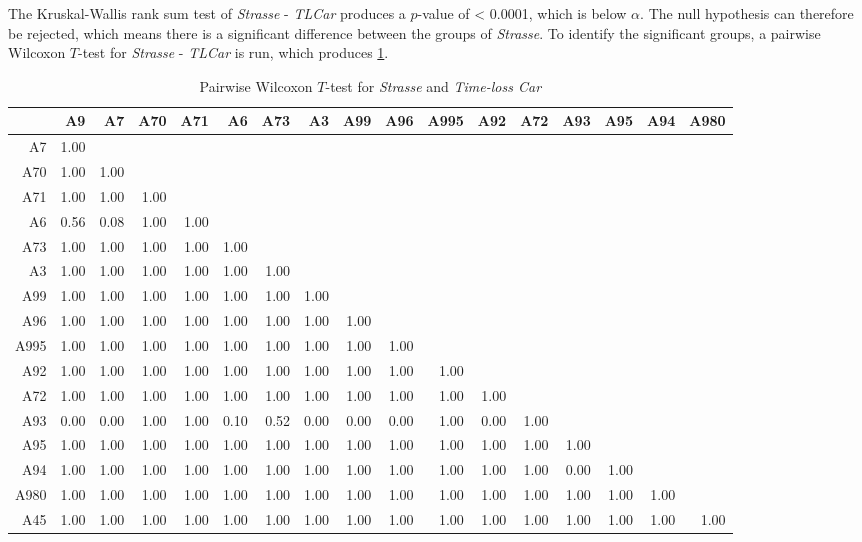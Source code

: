 The Kruskal-Wallis rank sum test of \textit{Strasse} - \textit{TLCar} produces a $p$-value of < 0.0001, which is below $\alpha$. The null hypothesis can therefore be rejected, which means there is a significant difference between the groups of \textit{Strasse}. To identify the significant groups, a pairwise Wilcoxon $T$-test for \textit{Strasse} - \textit{TLCar} is run, which produces \cref{tbl:wilcoxon_arbis_matched_Strasse_TLCar}. 
\begin{table}[ht!]
	\tiny
	\setlength{\tabcolsep}{4pt}
	\centering
	\begin{tabular}{rrrrrrrrrrrrrrrrr}
		\hline
			& A9 & A7 & A70 & A71 & A6 & A73 & A3 & A99 & A96 & A995 & A92 & A72 & A93 & A95 & A94 & A980 \\ 
		\hline
		A7   & 1.00 &  &  &  &  &  &  &  &  &  &  &  &  &  &  &  \\ 
		A70  & 1.00 & 1.00 &  &  &  &  &  &  &  &  &  &  &  &  &  &  \\ 
		A71  & 1.00 & 1.00 & 1.00 &  &  &  &  &  &  &  &  &  &  &  &  &  \\ 
		A6   & 0.56 & 0.08 & 1.00 & 1.00 &  &  &  &  &  &  &  &  &  &  &  &  \\ 
		A73  & 1.00 & 1.00 & 1.00 & 1.00 & 1.00 &  &  &  &  &  &  &  &  &  &  &  \\ 
		A3   & 1.00 & 1.00 & 1.00 & 1.00 & 1.00 & 1.00 &  &  &  &  &  &  &  &  &  &  \\ 
		A99  & 1.00 & 1.00 & 1.00 & 1.00 & 1.00 & 1.00 & 1.00 &  &  &  &  &  &  &  &  &  \\ 
		A96  & 1.00 & 1.00 & 1.00 & 1.00 & 1.00 & 1.00 & 1.00 & 1.00 &  &  &  &  &  &  &  &  \\ 
		A995 & 1.00 & 1.00 & 1.00 & 1.00 & 1.00 & 1.00 & 1.00 & 1.00 & 1.00 &  &  &  &  &  &  &  \\ 
		A92  & 1.00 & 1.00 & 1.00 & 1.00 & 1.00 & 1.00 & 1.00 & 1.00 & 1.00 & 1.00 &  &  &  &  &  &  \\ 
		A72  & 1.00 & 1.00 & 1.00 & 1.00 & 1.00 & 1.00 & 1.00 & 1.00 & 1.00 & 1.00 & 1.00 &  &  &  &  &  \\ 
		A93  & 0.00 & 0.00 & 1.00 & 1.00 & 0.10 & 0.52 & 0.00 & 0.00 & 0.00 & 1.00 & 0.00 & 1.00 &  &  &  &  \\ 
		A95  & 1.00 & 1.00 & 1.00 & 1.00 & 1.00 & 1.00 & 1.00 & 1.00 & 1.00 & 1.00 & 1.00 & 1.00 & 1.00 &  &  &  \\ 
		A94  & 1.00 & 1.00 & 1.00 & 1.00 & 1.00 & 1.00 & 1.00 & 1.00 & 1.00 & 1.00 & 1.00 & 1.00 & 0.00 & 1.00 &  &  \\ 
		A980 & 1.00 & 1.00 & 1.00 & 1.00 & 1.00 & 1.00 & 1.00 & 1.00 & 1.00 & 1.00 & 1.00 & 1.00 & 1.00 & 1.00 & 1.00 &  \\ 
		A45  & 1.00 & 1.00 & 1.00 & 1.00 & 1.00 & 1.00 & 1.00 & 1.00 & 1.00 & 1.00 & 1.00 & 1.00 & 1.00 & 1.00 & 1.00 & 1.00 \\ 
		\bottomrule
	\end{tabular}
	\caption{Pairwise Wilcoxon $T$-test for \textit{Strasse} and \textit{Time-loss Car}}
	\label{tbl:wilcoxon_arbis_matched_Strasse_TLCar}
\end{table}
